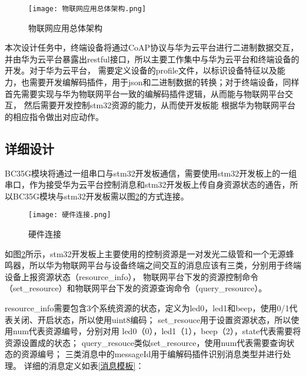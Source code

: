 \begin{figure}[h]
    \centering
  	\texttt{[image: 物联网应用总体架构.png]}
	\caption{物联网应用总体架构}
	\label{物联网应用总体架构}
\end{figure}

本次设计任务中，终端设备将通过CoAP协议与华为云平台进行二进制数据交互，并由华为云平台暴露出restful接口，所以主要工作集中与华为云平台和终端设备的开发。对于华为云平台，
需要定义设备的profile文件，以标识设备特征以及能力，也需要开发编解码插件，用于json和二进制数据的转换；对于终端设备，同样首先需要实现与华为物联网平台一致的编解码插件逻辑，从而能与物联网平台交互，
然后需要开发控制stm32资源的能力，从而使开发板能
根据华为物联网平台的相应指令做出对应动作。

\subsection{详细设计}

BC35G模块将通过一组串口与stm32开发板通信，需要使用stm32开发板上的一组串口，作为接受华为云平台控制消息和stm32开发板上传自身资源状态的通告，所以BC35G模块与stm32开发板需以图\ref{硬件连接}的方式连接。
\begin{figure}[h]
    \centering
  	\texttt{[image: 硬件连接.png]}
	\caption{硬件连接}
	\label{硬件连接}
\end{figure}

如图\ref{硬件连接}所示，stm32开发板上主要使用的控制资源是一对发光二级管和一个无源蜂鸣器，所以华为物联网平台与设备终端之间交互的消息应该有三类，分别用于终端设备上报资源状态（resource\_info），
物联网平台下发的资源控制命令（set\_resource）和物联网平台下发的资源查询命令（query\_resource）。

resource\_info需要包含3个系统资源的状态，定义为led0，led1和beep，使用0/1代表关闭、开启状态，所以使用uint8编码；
set\_resouce用于设置资源状态，所以使用num代表资源编号，分别对用 led0（0），led1（1），beep（2），state代表需要将资源设置成的状态；
query\_resouce类似set\_resource，使用num代表需要查询状态的资源编号；
三类消息中的messageId用于编解码插件识别消息类型并进行处理。
详细的消息定义如表\ref{消息模板}：

